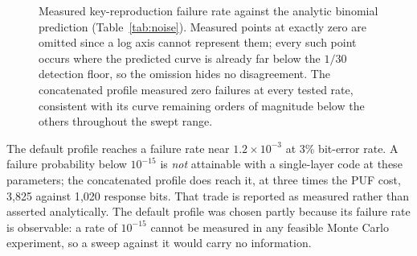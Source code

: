 \documentclass[journal]{IEEEtran}
\begin{document}
\begin{figure}[H]
\centering
{}
\caption{Measured key-reproduction failure rate against the analytic binomial
prediction (Table~\ref{tab:noise}). Measured points at exactly zero are omitted
since a log axis cannot represent them; every such point occurs where the
predicted curve is already far below the $1/30$ detection floor, so the
omission hides no disagreement. The concatenated profile measured zero failures
at every tested rate, consistent with its curve remaining orders of magnitude
below the others throughout the swept range.}
\label{fig:rel}
\end{figure}

The default profile reaches a failure rate near $1.2\times10^{-3}$ at 3\%
bit-error rate. A failure probability below $10^{-15}$ is \emph{not} attainable
with a single-layer code at these parameters; the concatenated profile does
reach it, at three times the PUF cost, 3{,}825 against 1{,}020 response bits.
That trade is reported as measured rather than asserted analytically. The
default profile was chosen partly because its failure rate is observable: a
rate of $10^{-15}$ cannot be measured in any feasible Monte Carlo experiment,
so a sweep against it would carry no information.
\end{document}
